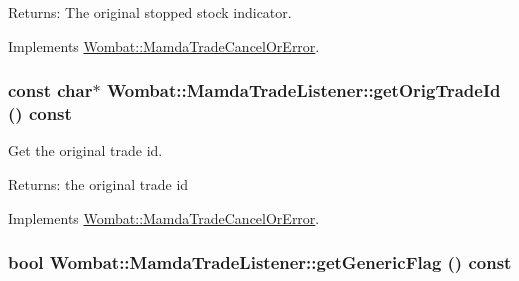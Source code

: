 \begin{Desc}
\item[Returns:]The original stopped stock indicator. \end{Desc}


Implements \hyperlink{classWombat_1_1MamdaTradeCancelOrError_c7cf998aa454b310389b03c0b8be095e}{Wombat::Mamda\-Trade\-Cancel\-Or\-Error}.\hypertarget{classWombat_1_1MamdaTradeListener_f63f45ca9303c611b885390a012d6b87}{
\subsubsection[getOrigTradeId]{\setlength{\rightskip}{0pt plus 5cm}const char$\ast$ Wombat::Mamda\-Trade\-Listener::get\-Orig\-Trade\-Id () const}}
\label{classWombat_1_1MamdaTradeListener_f63f45ca9303c611b885390a012d6b87}


Get the original trade id. 

\begin{Desc}
\item[Returns:]the original trade id \end{Desc}


Implements \hyperlink{classWombat_1_1MamdaTradeCancelOrError_77edcaedced6b03219438ef4b2bcef68}{Wombat::Mamda\-Trade\-Cancel\-Or\-Error}.\hypertarget{classWombat_1_1MamdaTradeListener_f6591781ca46aa1392877bbf12c9e2f5}{
\subsubsection[getGenericFlag]{\setlength{\rightskip}{0pt plus 5cm}bool Wombat::Mamda\-Trade\-Listener::get\-Generic\-Flag () const}}
\label{classWombat_1_1MamdaTradeListener_f6591781ca46aa1392877bbf12c9e2f5}




